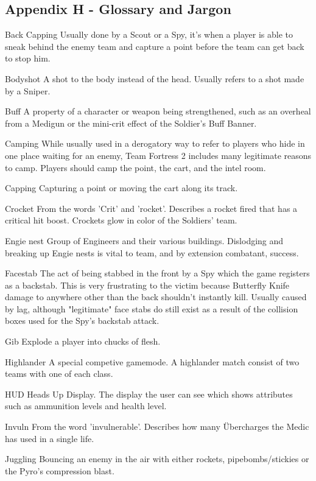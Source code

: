 \subsection{Appendix H - Glossary and Jargon}

Back Capping Usually done by a Scout or a Spy, it’s when a player is able to sneak behind the enemy team and capture a point before the team can get back to stop him.

Bodyshot A shot to the body instead of the head. Usually refers to a shot made by a Sniper. 

Buff A property of a character or weapon being strengthened, such as an overheal from a Medigun or the mini-crit effect of the Soldier's Buff Banner.

Camping While usually used in a derogatory way to refer to players who hide in one place waiting for an enemy, Team Fortress 2 includes many legitimate reasons to camp. Players should camp the point, the cart, and the intel room.

Capping Capturing a point or moving the cart along its track.

Crocket From the words 'Crit' and 'rocket'. Describes a rocket fired that has a critical hit boost. Crockets glow in color of the Soldiers' team.

Engie nest Group of Engineers and their various buildings. Dislodging and breaking up Engie nests is vital to team, and by extension combatant, success. 

Facestab The act of being stabbed in the front by a Spy which the game registers as a backstab. This is very frustrating to the victim because Butterfly Knife damage to anywhere other than the back shouldn't instantly kill. Usually caused by lag, although "legitimate" face stabs do still exist as a result of the collision boxes used for the Spy's backstab attack. 

Gib Explode a player into chucks of flesh.

Highlander A special competive gamemode. A highlander match consist of two teams with one of each class.

HUD Heads Up Display. The display the user can see which shows attributes such as ammunition levels and health level.

Invuln From the word 'invulnerable'. Describes how many Übercharges the Medic has used in a single life.  

Juggling Bouncing an enemy in the air with either rockets, pipebombs/stickies or the Pyro's compression blast.

